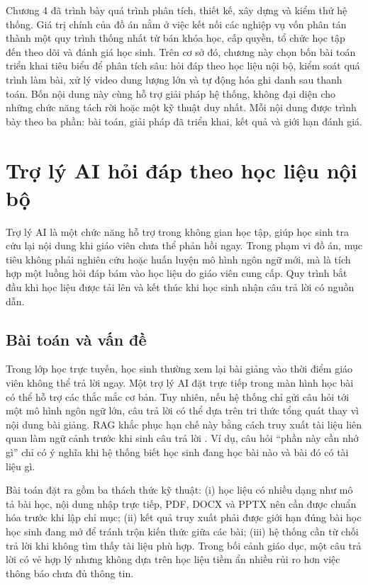 \documentclass[../DoAn.tex]{subfiles}
\begin{document}
Chương 4 đã trình bày quá trình phân tích, thiết kế, xây dựng và kiểm thử hệ thống. Giá trị chính của đồ án nằm ở việc kết nối các nghiệp vụ vốn phân tán thành một quy trình thống nhất từ bán khóa học, cấp quyền, tổ chức học tập đến theo dõi và đánh giá học sinh. Trên cơ sở đó, chương này chọn bốn bài toán triển khai tiêu biểu để phân tích sâu: hỏi đáp theo học liệu nội bộ, kiểm soát quá trình làm bài, xử lý video dung lượng lớn và tự động hóa ghi danh sau thanh toán. Bốn nội dung này cùng hỗ trợ giải pháp hệ thống, không đại diện cho những chức năng tách rời hoặc một kỹ thuật duy nhất. Mỗi nội dung được trình bày theo ba phần: bài toán, giải pháp đã triển khai, kết quả và giới hạn đánh giá.

\section{Trợ lý AI hỏi đáp theo học liệu nội bộ}
\label{section:5.1}

Trợ lý AI là một chức năng hỗ trợ trong không gian học tập, giúp học sinh tra cứu lại nội dung khi giáo viên chưa thể phản hồi ngay. Trong phạm vi đồ án, mục tiêu không phải nghiên cứu hoặc huấn luyện mô hình ngôn ngữ mới, mà là tích hợp một luồng hỏi đáp bám vào học liệu do giáo viên cung cấp. Quy trình bắt đầu khi học liệu được tải lên và kết thúc khi học sinh nhận câu trả lời có nguồn dẫn.

\subsection{Bài toán và vấn đề}
\label{section:5.1.1}

Trong lớp học trực tuyến, học sinh thường xem lại bài giảng vào thời điểm giáo viên không thể trả lời ngay. Một trợ lý AI đặt trực tiếp trong màn hình học bài có thể hỗ trợ các thắc mắc cơ bản. Tuy nhiên, nếu hệ thống chỉ gửi câu hỏi tới một mô hình ngôn ngữ lớn, câu trả lời có thể dựa trên tri thức tổng quát thay vì nội dung bài giảng. RAG khắc phục hạn chế này bằng cách truy xuất tài liệu liên quan làm ngữ cảnh trước khi sinh câu trả lời \cite{lewis2020rag}. Ví dụ, câu hỏi ``phần này cần nhớ gì'' chỉ có ý nghĩa khi hệ thống biết học sinh đang học bài nào và bài đó có tài liệu gì.

Bài toán đặt ra gồm ba thách thức kỹ thuật: (i) học liệu có nhiều dạng như mô tả bài học, nội dung nhập trực tiếp, PDF, DOCX và PPTX nên cần được chuẩn hóa trước khi lập chỉ mục; (ii) kết quả truy xuất phải được giới hạn đúng bài học học sinh đang mở để tránh trộn kiến thức giữa các bài; (iii) hệ thống cần từ chối trả lời khi không tìm thấy tài liệu phù hợp. Trong bối cảnh giáo dục, một câu trả lời có vẻ hợp lý nhưng không dựa trên học liệu tiềm ẩn nhiều rủi ro hơn việc thông báo chưa đủ thông tin.
\end{document}
